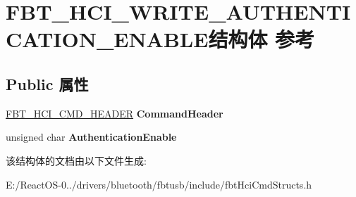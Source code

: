 \hypertarget{struct_f_b_t___h_c_i___w_r_i_t_e___a_u_t_h_e_n_t_i_c_a_t_i_o_n___e_n_a_b_l_e}{}\section{F\+B\+T\+\_\+\+H\+C\+I\+\_\+\+W\+R\+I\+T\+E\+\_\+\+A\+U\+T\+H\+E\+N\+T\+I\+C\+A\+T\+I\+O\+N\+\_\+\+E\+N\+A\+B\+L\+E结构体 参考}
\label{struct_f_b_t___h_c_i___w_r_i_t_e___a_u_t_h_e_n_t_i_c_a_t_i_o_n___e_n_a_b_l_e}
\subsection*{Public 属性}
\begin{DoxyCompactItemize}
\item 
\mbox{\label{struct_f_b_t___h_c_i___w_r_i_t_e___a_u_t_h_e_n_t_i_c_a_t_i_o_n___e_n_a_b_l_e_a550bde5ef6965d90c53803f5a6b675da}} 
\hyperlink{struct_f_b_t___h_c_i___c_m_d___h_e_a_d_e_r}{F\+B\+T\+\_\+\+H\+C\+I\+\_\+\+C\+M\+D\+\_\+\+H\+E\+A\+D\+ER} {\bfseries Command\+Header}
\item 
\mbox{\label{struct_f_b_t___h_c_i___w_r_i_t_e___a_u_t_h_e_n_t_i_c_a_t_i_o_n___e_n_a_b_l_e_a790665613e0cf111bd8b5eb4726c4971}} 
unsigned char {\bfseries Authentication\+Enable}
\end{DoxyCompactItemize}


该结构体的文档由以下文件生成\+:\begin{DoxyCompactItemize}
\item 
E\+:/\+React\+O\+S-\/0../drivers/bluetooth/fbtusb/include/fbt\+Hci\+Cmd\+Structs.\+h\end{DoxyCompactItemize}
